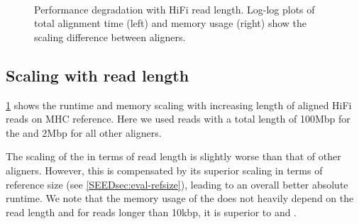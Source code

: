 \begin{figure}[H]
	\centering
	~\hspace{1em} \caption[Performance scaling with query length
  (long reads)]{Performance degradation with HiFi read length. Log-log plots of
  total alignment time (left) and memory usage (right) show the scaling
  difference between aligners.}
	\label{SEEDfig:hifi_scaling_with_readlen}
  \end{figure}

\subsection{Scaling with read length}

\cref{SEEDfig:hifi_scaling_with_readlen} shows the runtime and memory scaling with
increasing length of aligned HiFi reads on MHC reference. Here we used reads
with a total length of 100Mbp for the \sh and 2Mbp for all other aligners.

The scaling of the \sh in terms of read length is slightly worse than that of
other aligners. However, this is compensated by its superior scaling in terms of
reference size (see \cref{SEEDsec:eval-refsize}), leading to an overall better
absolute runtime. We note that the memory usage of the \sh does not heavily
depend on the read length and for reads longer than 10kbp, it is superior to
\graphaligner and \vargas.

